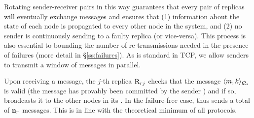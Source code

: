 Rotating sender-receiver pairs in this way guarantees that every pair of replicas will eventually exchange messages and ensures that (1) information about the state of each node is propagated to every other node in the system, and (2) no sender is continuously sending to a faulty replica (or vice-versa). This process is also essential to bounding the number of re-transmissions needed in the presence of failures (more detail in \S\ref{ss:failures}). As is standard in TCP, we allow senders to transmit a window of messages in parallel.
%
%
%


\par \textbf{} Upon receiving a message, the $j$-th replica $\textsc{R}_{{r}{j}}$ checks that the message $\langle m, k\rangle_{\mathcal{Q}_{s}}$ is valid (the message has provably been committed by the sender \RSM{}) and if so, broadcasts it to the other nodes in its \RSM{}.  In the failure-free case,
\Scrooge{} thus sends a total of $\textbf{n}_{r}$ messages. This is in line with the theoretical minimum of all \CCC{} protocols.

